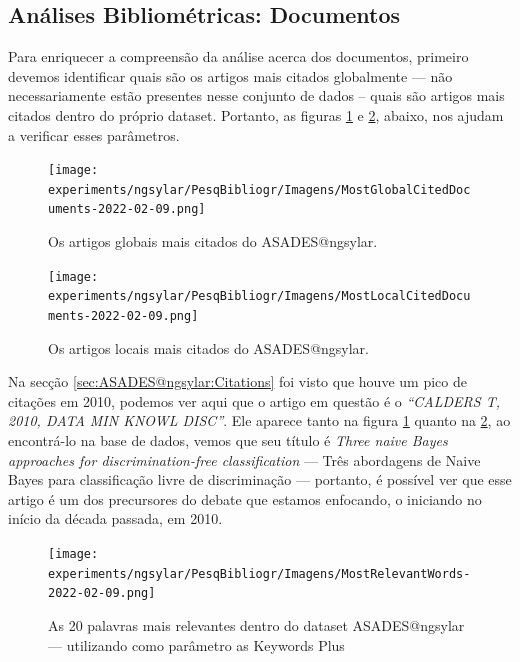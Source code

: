 \subsection{Análises Bibliométricas: Documentos}

Para enriquecer a compreensão da análise acerca dos documentos, primeiro devemos identificar quais são os artigos mais citados globalmente --- não necessariamente estão presentes nesse conjunto de dados -- quais são artigos mais citados dentro do próprio dataset. Portanto, as figuras \ref{fig:ASADES@ngsylar:GlobalCitedDocs} e \ref{fig:ASADES@ngsylar:LocalCitedDocs}, abaixo, nos ajudam a verificar esses parâmetros.

\begin{figure}[H]
    \centering
    \texttt{[image: experiments/ngsylar/PesqBibliogr/Imagens/MostGlobalCitedDocuments-2022-02-09.png]}
    \caption{Os artigos globais mais citados do ASADES@ngsylar.}
    \label{fig:ASADES@ngsylar:GlobalCitedDocs}
\end{figure}

\begin{figure}[H]
    \centering
\texttt{[image: experiments/ngsylar/PesqBibliogr/Imagens/MostLocalCitedDocuments-2022-02-09.png]}
    \caption{Os artigos locais mais citados do ASADES@ngsylar.}
    \label{fig:ASADES@ngsylar:LocalCitedDocs}
\end{figure}

Na secção \ref{sec:ASADES@ngsylar:Citations} foi visto que houve um pico de citações em 2010, podemos ver aqui que o artigo em questão é o \textit{``CALDERS T, 2010, DATA MIN KNOWL DISC''}. Ele aparece tanto na figura \ref{fig:ASADES@ngsylar:GlobalCitedDocs} quanto na \ref{fig:ASADES@ngsylar:LocalCitedDocs}, ao encontrá-lo na base de dados, vemos que seu título é \textit{Three naive Bayes approaches for discrimination-free classification} --- Três abordagens de Naive Bayes para classificação livre de discriminação --- portanto, é possível ver que esse artigo é um dos precursores do debate que estamos enfocando, o iniciando no início da década passada, em 2010.

\begin{figure}[H]
    \centering
    \texttt{[image: experiments/ngsylar/PesqBibliogr/Imagens/MostRelevantWords-2022-02-09.png]}
    \caption{As 20 palavras mais relevantes dentro do dataset ASADES@ngsylar --- utilizando como parâmetro as Keywords Plus}
    \label{fig:ASADES@ngsylar:RelevantWords}
\end{figure}

